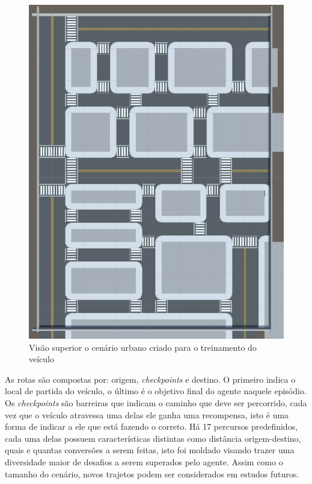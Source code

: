 \begin{figure}[h]
   \centering
   \includegraphics[scale=0.45, angle=90]{figs/Mapa-simulador-visao-superior.png}
    \caption{Visão superior o cenário urbano criado para o treinamento do veículo}
    \label{fig:map-view}
 \end{figure}

As rotas são compostas por: origem, \textit{checkpoints} e destino. O primeiro indica o local de partida do veículo, o último é o objetivo final do agente naquele episódio. Os \textit{checkpoints} são barreiras que indicam o caminho que deve ser percorrido, cada vez que o veículo atravessa uma delas ele ganha uma recompensa, isto é uma forma de indicar a ele que está fazendo o correto. Há 17 percursos predefinidos, cada uma delas possuem características distintas como distância origem-destino, quais e quantas conversões a serem feitas, isto foi moldado visando trazer uma diversidade maior de desafios a serem superados pelo agente. Assim como o tamanho do cenário, novos trajetos podem ser considerados em estudos futuros.

